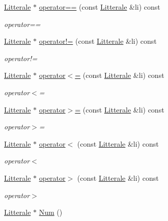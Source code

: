 \begin{DoxyCompactItemize}
\hyperlink{class_litterale}{Litterale} $\ast$ \hyperlink{class_li_expression_a30334b98ebe99c3b06596b964b74aa2b}{operator==} (const \hyperlink{class_litterale}{Litterale} \&li) const 
\begin{DoxyCompactList}\small\item\em operator== \end{DoxyCompactList}\item 
\hyperlink{class_litterale}{Litterale} $\ast$ \hyperlink{class_li_expression_a109d27f2e3a8717a0cd391db8042f3d7}{operator!=} (const \hyperlink{class_litterale}{Litterale} \&li) const 
\begin{DoxyCompactList}\small\item\em operator!= \end{DoxyCompactList}\item 
\hyperlink{class_litterale}{Litterale} $\ast$ \hyperlink{class_li_expression_a2803c38127ed58e1d8148e06e079dbb4}{operator$<$=} (const \hyperlink{class_litterale}{Litterale} \&li) const 
\begin{DoxyCompactList}\small\item\em operator$<$= \end{DoxyCompactList}\item 
\hyperlink{class_litterale}{Litterale} $\ast$ \hyperlink{class_li_expression_a9559555748722ee6f1a384527fef29a1}{operator$>$=} (const \hyperlink{class_litterale}{Litterale} \&li) const 
\begin{DoxyCompactList}\small\item\em operator$>$= \end{DoxyCompactList}\item 
\hyperlink{class_litterale}{Litterale} $\ast$ \hyperlink{class_li_expression_aa0182e19cd3c065f7da2318fdbd261fe}{operator$<$} (const \hyperlink{class_litterale}{Litterale} \&li) const 
\begin{DoxyCompactList}\small\item\em operator$<$ \end{DoxyCompactList}\item 
\hyperlink{class_litterale}{Litterale} $\ast$ \hyperlink{class_li_expression_a31d73a19962932144004d181dd46a203}{operator$>$} (const \hyperlink{class_litterale}{Litterale} \&li) const 
\begin{DoxyCompactList}\small\item\em operator$>$ \end{DoxyCompactList}\item 
\hyperlink{class_litterale}{Litterale} $\ast$ \hyperlink{class_li_expression_aff040ab50e34119fc3ef87a3810857dd}{Num} ()

\end{DoxyCompactItemize}
